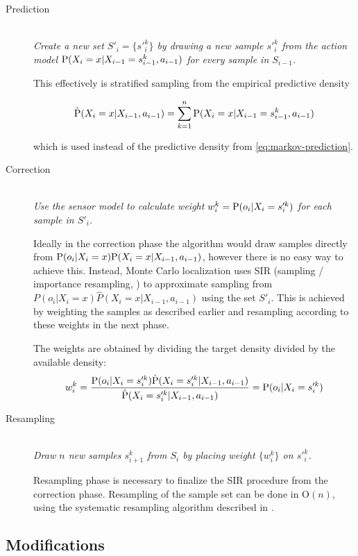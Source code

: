 \begin{description}
\item[Prediction] \hfill \\
	\emph{
	Create a new set \(S'_i = \{s'^k_{i}\} \)
	by drawing a new sample \(s'^k_{i}\)
	from the action model \(\P(X_i = x | X_{i-1} = s^k_{i-1}, a_{i - 1})\)
	for every sample in \(S_{i-1}\).
	}

	This effectively is stratified sampling from the empirical predictive density

	\begin{equation}
		\label{eq:mcl-predictive-density}
		\hat{\P}(X_i = x | X_{i - 1}, a_{i - 1}) =
		\sum_{k = 1}^n \P(X_i = x | X_{i-1} = s^k_{i-1}, a_{i - 1})
	\end{equation}
	
	which is used instead of the predictive density from \eqref{eq:markov-prediction}.

\item[Correction] \hfill \\
	\emph{
	Use the sensor model to calculate weight \(w^k_i = \P(o_i | X_i = s'^k_i)\)
	for each sample in \(S'_i\).
	}

	Ideally in the correction phase the algorithm would draw samples directly from
	\(\P(o_i | X_i = x) \P(X_i = x | X_{i - 1}, a_{i - 1})\),
	however there is no easy way to achieve this.
	Instead, Monte Carlo localization 
	uses SIR (sampling / importance resampling, \cite{smith92})
	to approximate sampling from
	\(P(o_i | X_i = x) \hat{P}(X_i = x | X_{i - 1}, a_{i - 1})\) using the set \(S'_i\).
	This is achieved by weighting the samples as described earlier and resampling
	according to these weights in the next phase.

	The weights are obtained by dividing the target density divided by the available density:
	\begin{equation}
		w^k_i = 
		\frac{
			\P(o_i | X_i = s'^k_i) \hat{\P}(X_i = s'^k_i | X_{i - 1}, a_{i - 1})
		}{
			\hat{\P}(X_i =  s'^k_i | X_{i - 1}, a_{i - 1})
		} = \P(o_i | X_i = s'^k_i)
	\end{equation}


\item[Resampling] \hfill \\
	\emph{
	Draw \(n\) new samples \(s^k_{i+1}\) from \(S_i\) by placing
	weight \(\{w^k_i\}\) on \(s'^k_{i}\).
	}

	Resampling phase is necessary to finalize the SIR procedure from the correction phase.
	Resampling of the sample set can be done in \(\mathrm{O}(n)\), using the systematic
	resampling algorithm described in \cite{arulampalam01}.
\end{description}

\subsection{Modifications}
